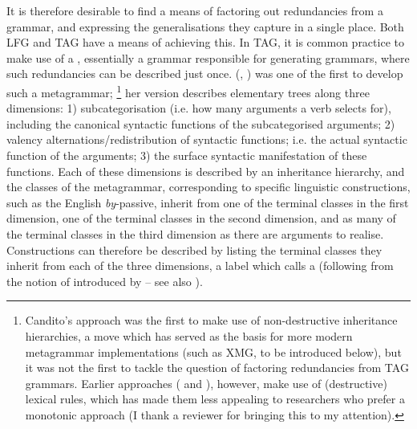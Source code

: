 \documentclass[output=paper,hidelinks]{langscibook}
\begin{document}
It is therefore desirable to find a means of factoring out redundancies from a
grammar, and expressing the generalisations they capture in a single place. Both
LFG and TAG have a means of achieving this. In TAG, it is common practice to
make use of a , essentially a grammar responsible for generating
grammars, where such redundancies can be described just once.
\citeauthor{candito:metagrammar} (\citeyear{candito:metagrammar},
\citeyear{candito:phd}) was one of the first to develop such a metagrammar;%
%
\footnote{Candito's approach was the first to make use of non-destructive
  inheritance hierarchies, a move which has served as the basis for more modern
  metagrammar implementations (such as XMG, to be introduced below), but it was
  not the first to tackle the question of factoring redundancies from TAG
  grammars. Earlier approaches (\citealt{Becker:94-hytag} and
  \citealt{Srinivas:etal:94-lexicalization}), however, make use of (destructive)
  lexical rules, which has made them less appealing to researchers who prefer a
  monotonic approach (I thank a reviewer for bringing this to my attention).}
%
her version describes elementary trees along three
dimensions: 1) subcategorisation (i.e. how many arguments a verb selects for),
including the canonical syntactic functions of the subcategorised arguments; 2)
valency alternations\slash redistribution of syntactic functions; i.e. the
actual syntactic function of the arguments; 3) the surface syntactic
manifestation of these functions. Each of these dimensions is described by an
inheritance hierarchy, and the classes of the metagrammar, corresponding to
specific linguistic constructions, such as the English \textit{by}-passive,
inherit from one of the terminal classes in the first dimension, one of the
terminal classes in the second dimension, and as many of the terminal classes in
the third dimension as there are arguments to realise. Constructions can
therefore be described by listing the terminal classes they inherit from each of
the three dimensions, a label which \citet{kinyon:hypertags} calls a
 (following from the notion of  introduced by
\citealt{bangalore:phd} -- see also \citealt{bangalore:introduction}).
\end{document}
